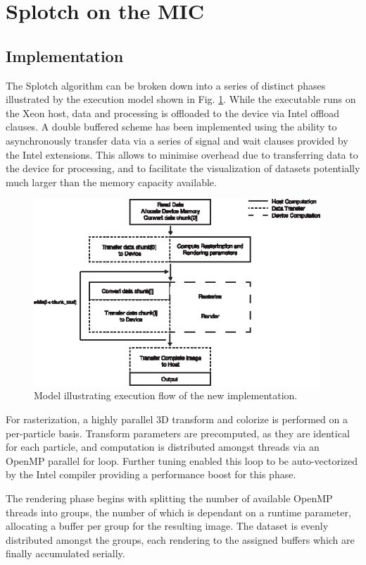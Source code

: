 \documentclass[runningheads,a4paper]{llncs}
\begin{document}
\section{Splotch on the MIC}
\label{sect:micsplotch}


\subsection{Implementation}
\label{sect:micimplementation}


The Splotch algorithm can be broken down into a series of distinct phases illustrated by the execution model shown in Fig. \ref{fig:exmodel}.
While the executable runs on the Xeon host, data and processing is offloaded to the device via Intel offload clauses.
A double buffered scheme has been implemented using the ability to asynchronously transfer data via a series of signal 
and wait clauses provided by the Intel extensions. This allows to minimise overhead due to transferring data to the device 
for processing, and to facilitate the visualization of datasets potentially much larger than the memory capacity available.

\begin{figure}
\centering
\includegraphics[height=7.0cm]{ExecutionModel}
\caption{Model illustrating execution flow of the new implementation.}
\label{fig:exmodel}
\end{figure}

For rasterization, a highly parallel 3D transform and colorize is performed on a per-particle
basis. Transform parameters are precomputed, as they are identical for each particle, and computation is distributed amongst
threads via an OpenMP parallel for loop. Further tuning enabled this loop to be auto-vectorized by the Intel compiler providing a 
performance boost for this phase.

The rendering phase begins with splitting the number of available OpenMP threads into groups, the number of which is dependant on 
a runtime parameter, allocating a buffer per group for the resulting image. The dataset is evenly distributed amongst the 
groups, each rendering to the assigned buffers which are finally accumulated serially. 
\end{document}
